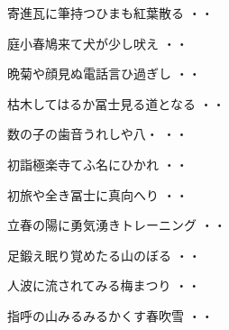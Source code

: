 \vspace{0.6cm}
\begin{shiika}寄進瓦に筆持つひまも紅葉散る
\hfill{・・}\end{shiika}
\vspace{0.6cm}
\begin{shiika}庭小春鳩来て犬が少し吠え
\hfill{・・}\end{shiika}
\vspace{0.6cm}
\begin{shiika}晩菊や顔見ぬ電話言ひ過ぎし
\hfill{・・}\end{shiika}
\vspace{0.6cm}
\begin{shiika}枯木してはるか冨士見る道となる
\hfill{・・}\end{shiika}
\vspace{0.6cm}
\begin{shiika}数の子の歯音うれしや八・
\hfill{・・}\end{shiika}
\vspace{0.6cm}
\begin{shiika}初詣極楽寺てふ名にひかれ
\hfill{・・}\end{shiika}
\vspace{0.6cm}
\begin{shiika}初旅や全き冨士に真向へり
\hfill{・・}\end{shiika}
\vspace{0.6cm}
\begin{shiika}立春の陽に勇気湧きトレーニング
\hfill{・・}\end{shiika}
\vspace{0.6cm}
\begin{shiika}足鍛え眠り覚めたる山のぼる
\hfill{・・}\end{shiika}
\vspace{0.6cm}
\begin{shiika}人波に流されてみる梅まつり
\hfill{・・}\end{shiika}
\vspace{0.6cm}
\begin{shiika}指呼の山みるみるかくす春吹雪
\hfill{・・}\end{shiika}
